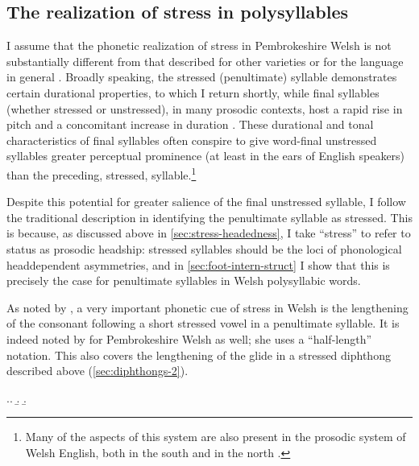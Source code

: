 \subsection{The realization of stress in polysyllables}
\label{sec:real-stress-polysyll}

I assume that the phonetic realization of stress in Pembrokeshire Welsh is not substantially different from that described for other varieties or for the language in general \citep{sommerfelt,jones49:_moder_welsh,pilch57:_lauts,watkins61:_ieith,thomas67:_welsh,rhys84:_inton,williams85:_pitch_welsh,williams99:_welsh,ball01:_welsh_phonet,bosch96:_promin,webb11:_welsh_englis}. Broadly speaking, the stressed (penultimate) syllable demonstrates certain durational properties, to which I return shortly, while final syllables (whether stressed or unstressed), in many prosodic contexts, host a rapid rise in pitch and a concomitant increase in duration \citep[\cfm][]{ohala78:_produc}. These durational and tonal characteristics of final syllables often conspire to give word\hyp final unstressed syllables greater perceptual prominence (at least in the ears of English speakers) than the preceding, stressed, syllable.\footnote{Many of the aspects of this system are also present in the prosodic system of Welsh English, both in the south \citep{walters03:_celtic_englis,walters03:_south_wales_valley_englis} and in the north \citep{webb11:_welsh_englis}.}

Despite this potential for greater salience of the final unstressed syllable, I follow the traditional description in identifying the penultimate syllable as stressed. This is because, as discussed above in \cref{sec:stress-headedness}, I take \enquote{stress} to refer to status as prosodic headship: stressed syllables should be the loci of phonological head\endash dependent asymmetries, and in \cref{sec:foot-intern-struct} I show that this is precisely the case for penultimate syllables in Welsh polysyllabic words.

As noted by \citet{jones67:_welsh,williams85:_pitch_welsh,williams99:_welsh,ball01:_welsh_phonet,webb11:_welsh_englis}, a very important phonetic cue of stress in Welsh is the lengthening of the consonant following a short stressed vowel in a penultimate syllable. It is indeed noted by \citet{awbery86:_pembr_welsh} for Pembrokeshire Welsh as well; she uses a \enquote{half-length} notation. This also covers the lengthening of the glide in a stressed diphthong described above (\cref{sec:diphthongs-2}).

\ex.\label{ex:penult-cons-lengthening}\a.
\b.
\b.

